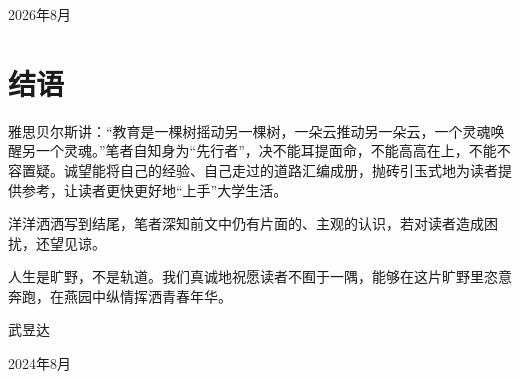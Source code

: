 \begin{flushright}
	2026年8月
\end{flushright}



\chapter*{结语}
雅思贝尔斯讲：“教育是一棵树摇动另一棵树，一朵云推动另一朵云，一个灵魂唤醒另一个灵魂。”笔者自知身为“先行者”，决不能耳提面命，不能高高在上，不能不容置疑。诚望能将自己的经验、自己走过的道路汇编成册，抛砖引玉式地为读者提供参考，让读者更快更好地“上手”大学生活。

\vspace{10pt}

洋洋洒洒写到结尾，笔者深知前文中仍有片面的、主观的认识，若对读者造成困扰，还望见谅。

\vspace{10pt}

人生是旷野，不是轨道。我们真诚地祝愿读者不囿于一隅，能够在这片旷野里恣意奔跑，在燕园中纵情挥洒青春年华。

\vspace{10pt}

\begin{flushright}
	武昱达
	
	2024年8月
\end{flushright}

